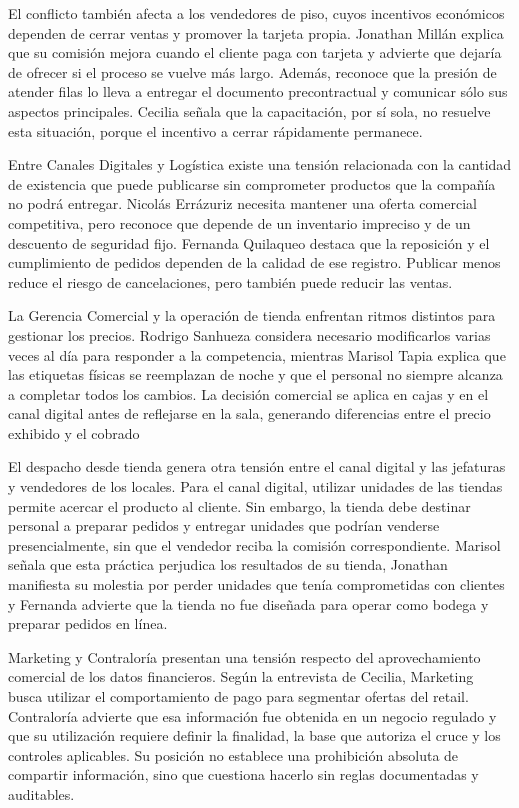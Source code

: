 \documentclass[11pt]{article}
\begin{document}
El conflicto también afecta a los vendedores de piso, cuyos incentivos económicos dependen de cerrar ventas y promover la tarjeta propia. Jonathan Millán explica que su comisión mejora cuando el cliente paga con tarjeta y advierte que dejaría de ofrecer si el proceso se vuelve más largo. Además, reconoce que la presión de atender filas lo lleva a entregar el documento precontractual y comunicar sólo sus aspectos principales. Cecilia señala que la capacitación, por sí sola, no resuelve esta situación, porque el incentivo a cerrar rápidamente permanece.

Entre Canales Digitales y Logística existe una tensión relacionada con la cantidad de existencia que puede publicarse sin comprometer productos que la compañía no podrá entregar. Nicolás Errázuriz necesita mantener una oferta comercial competitiva, pero reconoce que depende de un inventario impreciso y de un descuento de seguridad fijo. Fernanda Quilaqueo destaca que la reposición y el cumplimiento de pedidos dependen de la calidad de ese registro. Publicar menos reduce el riesgo de cancelaciones, pero también puede reducir las ventas.

La Gerencia Comercial y la operación de tienda enfrentan ritmos distintos para gestionar los precios. Rodrigo Sanhueza considera necesario modificarlos varias veces al día para responder a la competencia, mientras Marisol Tapia explica que las etiquetas físicas se reemplazan de noche y que el personal no siempre alcanza a completar todos los cambios. La decisión comercial se aplica en cajas y en el canal digital antes de reflejarse en la sala, generando diferencias entre el precio exhibido y el cobrado

El despacho desde tienda genera otra tensión entre el canal digital y las jefaturas y vendedores de los locales. Para el canal digital, utilizar unidades de las tiendas permite acercar el producto al cliente. Sin embargo, la tienda debe destinar personal a preparar pedidos y entregar unidades que podrían venderse presencialmente, sin que el vendedor reciba la comisión correspondiente. Marisol señala que esta práctica perjudica los resultados de su tienda, Jonathan manifiesta su molestia por perder unidades que tenía comprometidas con clientes y Fernanda advierte que la tienda no fue diseñada para operar como bodega y preparar pedidos en línea.

Marketing y Contraloría presentan una tensión respecto del aprovechamiento comercial de los datos financieros. Según la entrevista de Cecilia, Marketing busca utilizar el comportamiento de pago para segmentar ofertas del retail. Contraloría advierte que esa información fue obtenida en un negocio regulado y que su utilización requiere definir la finalidad, la base que autoriza el cruce y los controles aplicables. Su posición no establece una prohibición absoluta de compartir información, sino que cuestiona hacerlo sin reglas documentadas y auditables.
\end{document}
